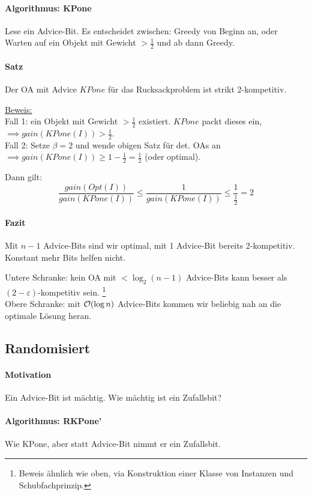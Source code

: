\paragraph{Algorithmus: KPone}
Lese ein Advice-Bit. Es entscheidet zwischen: Greedy von Beginn an, oder Warten auf ein Objekt
mit Gewicht $> \frac{1}{2}$ und ab dann Greedy.

\paragraph{Satz}
Der OA mit Advice $KPone$ für das Rucksackproblem ist strikt 2-kompetitiv.

\underline{Beweis:}
\\
Fall 1: ein Objekt mit Gewicht $> \frac{1}{2}$ existiert. $KPone$ packt dieses ein,
$\implies gain(KPone(I)) > \frac{1}{2}$.
\\
Fall 2: Setze $\beta = 2$ und wende obigen Satz für det. OAs an
$\implies gain(KPone(I)) \geq 1 - \frac{1}{2} = \frac{1}{2}$ (oder optimal).

Dann gilt:
$$ \frac{gain(Opt(I))}{gain(KPone(I))} \leq \frac{1}{gain(KPone(I))} \leq \frac{1}{\frac{1}{2}} = 2 $$

\paragraph{Fazit}
Mit $n-1$ Advice-Bits sind wir optimal, mit 1 Advice-Bit bereits 2-kompetitiv.
Konstant mehr Bits helfen nicht.

Untere Schranke: kein OA mit $< \log_2 (n-1)$ Advice-Bits kann besser als $(2-\varepsilon)$-kompetitiv sein.
\footnote{Beweis ähnlich wie oben, via Konstruktion einer Klasse von Instanzen und Schubfachprinzip.}
\\
Obere Schranke: mit $\mathcal{O}(\log n)$ Advice-Bits kommen wir beliebig nah an die optimale Lösung heran.


\subsection{Randomisiert}

\paragraph{Motivation}
Ein Advice-Bit ist mächtig. Wie mächtig ist ein Zufallsbit?

\paragraph{Algorithmus: RKPone'}
Wie KPone, aber statt Advice-Bit nimmt er ein Zufallsbit.

